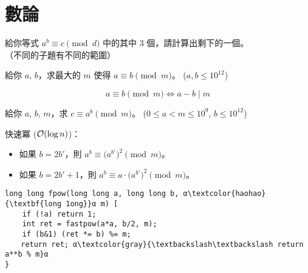 \documentclass[standalone]{beamer}
\begin{document}
\section{數論}

\begin{frame}{}
  \begin{problem}
    給你等式 $a^b \equiv c \pmod{d}$ 中的其中 $3$ 個，請計算出剩下的一個。\\
    （不同的子題有不同的範圍）
  \end{problem}
\end{frame}

\begin{frame}{}
  \begin{problem}
    給你 $a$, $b$，求最大的 $m$ 使得 $a \equiv b \pmod{m}$。 ($a, b \leq 10^{12}$)
  \end{problem} \pause

  \begin{definition} \vspace{-0.5\baselineskip}
    \[ a \equiv b \pmod{m} \iff a - b \mid m \]
  \end{definition}
\end{frame}

\begin{frame}[fragile]{}
  \begin{problem}
    給你 $a$, $b$, $m$，求 $c \equiv a^b \pmod{m}$。 ($0 \leq a < m \leq 10^{9}$, $b \leq 10^{12}$)
  \end{problem} \pause \disskip
  快速冪 ($\mathcal{O}(\log n)$)： \disskip
  \begin{itemize}[<+->]
    \item 如果 $b = 2b'$，則 $a^b \equiv \big( a^{b'} \big)^2 \pmod{m}$。
    \item 如果 $b = 2b' + 1$，則 $a^b \equiv a \cdot \big( a^{b'} \big)^2 \pmod{m}$。
  \end{itemize} \disskip
  \onslide<+->
  \begin{verbatim}
long long fpow(long long a, long long b, α\textcolor{haohao}{\textbf{long 1ong}}α m) [
    if (!a) return 1;
    int ret = fastpow(a*a, b/2, m);
    if (b&1) (ret *= b) %= m;
  　return ret; α\textcolor{gray}{\textbackslash\textbackslash return a**b % m}α
}
  \end{verbatim}
\end{frame}
\end{document}
